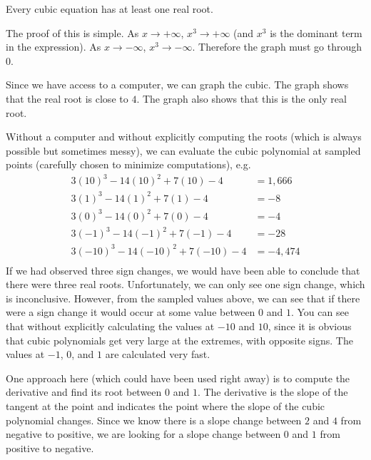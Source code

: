 \documentclass[12pt]{article}
\begin{document}
\begin{answer}

\begin{theorem*}
Every cubic equation has at least one real root.
\end{theorem*}
The proof of this is simple. As $x\rightarrow+\infty$, $x^{3}\rightarrow+\infty$ (and $x^3$ is the dominant term in the expression). As $x\rightarrow-\infty$, $x^{3}\rightarrow-\infty$. Therefore the graph must go through $0$. 

Since we have access to a computer, we can graph the cubic. The graph shows that the real root is close to $4$. The graph also shows that this is the only real root. 
\begin{center}
\end{center}

Without a computer and without explicitly computing the roots (which is always possible but sometimes messy), we can evaluate the cubic polynomial at sampled points (carefully chosen to minimize computations), e.g.
\begin{align*}
3(10)^{3} - 14(10)^2 + 7(10) - 4 & = 1,666 \\ 
3(1)^{3} - 14(1)^2 + 7(1) - 4 & = -8\\
3(0)^{3} - 14(0)^2 + 7(0) - 4 & = -4 \\
3(-1)^{3} - 14(-1)^2 + 7(-1) - 4 & = -28 \\
3(-10)^{3} - 14(-10)^2 + 7(-10) - 4 & = -4,474 \\
\end{align*}
If we had observed three sign changes, we would have been able to conclude that there were three real roots. Unfortunately, we can only see one sign change, which is inconclusive. However, from the sampled values above, we can see that if there were a sign change it would occur at some value between $0$ and $1$. You can see that without explicitly calculating the values at $-10$ and $10$, since it is obvious that cubic polynomials get very large at the extremes, with opposite signs. The values at $-1$, $0$, and $1$ are calculated very fast. 

One approach here (which could have been used right away) is to compute the derivative and find its root between $0$ and $1$. The derivative is the slope of the tangent at the point and indicates the point where the slope of the cubic polynomial changes. Since we know there is a slope change between $2$ and $4$ from negative to positive, we are looking for a slope change between $0$ and $1$ from positive to negative. 


\end{answer}
\end{document}
